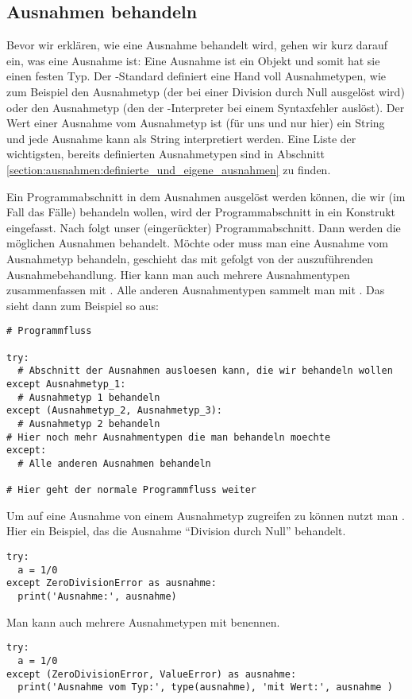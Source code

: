 \subsection{Ausnahmen behandeln}
\label{section:ausnahmen:ausnahmen_behandeln}
Bevor wir erklären, wie eine Ausnahme behandelt wird, gehen wir kurz darauf ein, was eine Ausnahme ist:
Eine Ausnahme ist ein Objekt und somit hat sie einen festen Typ.
Der \Python-Standard definiert eine Hand voll Ausnahmetypen, wie zum Beispiel
den Ausnahmetyp  (der bei einer Division durch Null ausgelöst wird) oder
den Ausnahmetyp  (den der \Python-Interpreter bei einem Syntaxfehler auslöst).
Der Wert einer Ausnahme  vom Ausnahmetyp  ist (für uns und nur hier) ein String und jede Ausnahme kann als String interpretiert werden.
Eine Liste der wichtigsten, bereits definierten Ausnahmetypen sind in Abschnitt \ref{section:ausnahmen:definierte_und_eigene_ausnahmen} zu finden.

Ein Programmabschnitt in dem Ausnahmen ausgelöst werden können, die wir (im Fall das Fälle) behandeln wollen,
wird der Programmabschnitt in ein  Konstrukt eingefasst.
Nach  folgt unser (eingerückter) Programmabschnitt.
Dann werden die möglichen Ausnahmen behandelt.
Möchte oder muss man eine Ausnahme vom Ausnahmetyp  behandeln, geschieht das mit  gefolgt von der auszuführenden Ausnahmebehandlung.
Hier kann man auch mehrere Ausnahmentypen zusammenfassen mit .
Alle anderen Ausnahmentypen sammelt man mit .
Das sieht dann zum Beispiel so aus:
\begin{lstlisting}
# Programmfluss

try:
  # Abschnitt der Ausnahmen ausloesen kann, die wir behandeln wollen
except Ausnahmetyp_1:
  # Ausnahmetyp 1 behandeln
except (Ausnahmetyp_2, Ausnahmetyp_3):
  # Ausnahmetyp 2 behandeln
# Hier noch mehr Ausnahmentypen die man behandeln moechte
except:
  # Alle anderen Ausnahmen behandeln

# Hier geht der normale Programmfluss weiter
\end{lstlisting}

Um auf eine Ausnahme von einem Ausnahmetyp zugreifen zu können nutzt man .
Hier ein Beispiel, das die Ausnahme ``Division durch Null'' behandelt.
\begin{lstlisting}
try:
  a = 1/0
except ZeroDivisionError as ausnahme:
  print('Ausnahme:', ausnahme)
\end{lstlisting}
Man kann auch mehrere Ausnahmetypen mit  benennen.
\begin{lstlisting}
try:
  a = 1/0
except (ZeroDivisionError, ValueError) as ausnahme:
  print('Ausnahme vom Typ:', type(ausnahme), 'mit Wert:', ausnahme )
\end{lstlisting}

